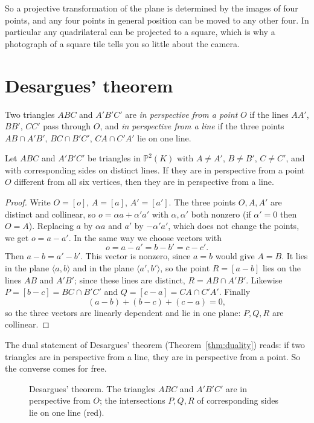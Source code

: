 So a projective transformation of the plane is determined by the images of four points, and any four points in general position can be moved
to any other four. In particular any quadrilateral can be projected to a square, which is why a photograph of a square tile tells you so
little about the camera.

\section{Desargues' theorem}

Two triangles $ABC$ and $A'B'C'$ are \emph{in perspective from a point} $O$ if the lines $AA'$, $BB'$, $CC'$ pass through $O$, and \emph{in
perspective from a line} if the three points $AB\cap A'B'$, $BC\cap B'C'$, $CA\cap C'A'$ lie on one line.

\begin{theorem}[Desargues]\label{thm:desargues}
Let $ABC$ and $A'B'C'$ be triangles in $\mathbb P^2(K)$ with $A\ne A'$, $B\ne B'$, $C\ne C'$, and with corresponding sides on distinct lines. If
they are in perspective from a point $O$ different from all six vertices, then they are in perspective from a line.
\end{theorem}

\begin{proof}
Write $O=[o]$, $A=[a]$, $A'=[a']$. The three points $O,A,A'$ are distinct and collinear, so $o=\alpha a+\alpha'a'$ with $\alpha,\alpha'$ both
nonzero (if $\alpha'=0$ then $O=A$). Replacing $a$ by $\alpha a$ and $a'$ by $-\alpha'a'$, which does not change the points, we get $o=a-a'$. In
the same way we choose vectors with
\[
o=a-a'=b-b'=c-c'.
\]
Then $a-b=a'-b'$. This vector is nonzero, since $a=b$ would give $A=B$. It lies in the plane $\langle a,b\rangle$ and in the plane
$\langle a',b'\rangle$, so the point $R=[a-b]$ lies on the lines $AB$ and $A'B'$; since these lines are distinct, $R=AB\cap A'B'$. Likewise
$P=[b-c]=BC\cap B'C'$ and $Q=[c-a]=CA\cap C'A'$. Finally
\[
(a-b)+(b-c)+(c-a)=0,
\]
so the three vectors are linearly dependent and lie in one plane: $P,Q,R$ are collinear.
\end{proof}

The dual statement of Desargues' theorem (Theorem~\ref{thm:duality}) reads: if two triangles are in perspective from a line, they are in
perspective from a point. So the converse comes for free.

\begin{figure}[ht]
\centering
{}
\caption{Desargues' theorem. The triangles $ABC$ and $A'B'C'$ are in perspective from $O$; the intersections $P,Q,R$ of corresponding sides
lie on one line (red).}
\label{fig:desargues}
\end{figure}

